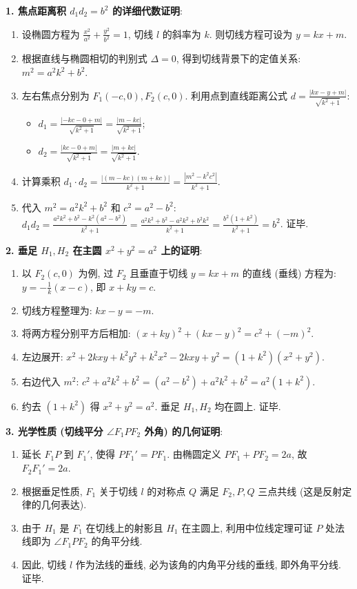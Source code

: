 \begin{proofbox}
\textbf{1. 焦点距离积 $d_1 d_2 = b^2$ 的详细代数证明}:
\begin{enumerate}
    \item 设椭圆方程为 $\frac{x^2}{a^2} + \frac{y^2}{b^2} = 1$, 切线 $l$ 的斜率为 $k$. 则切线方程可设为 $y = kx + m$.
    \item 根据直线与椭圆相切的判别式 $\Delta = 0$, 得到切线背景下的定值关系: $m^2 = a^2k^2 + b^2$.
    \item 左右焦点分别为 $F_1(-c, 0), F_2(c, 0)$. 利用点到直线距离公式 $d = \frac{|kx - y + m|}{\sqrt{k^2+1}}$:
    \begin{itemize}
        \item $d_1 = \frac{|-kc - 0 + m|}{\sqrt{k^2+1}} = \frac{|m - kc|}{\sqrt{k^2+1}}$;
        \item $d_2 = \frac{|kc - 0 + m|}{\sqrt{k^2+1}} = \frac{|m + kc|}{\sqrt{k^2+1}}$.
    \end{itemize}
    \item 计算乘积 $d_1 \cdot d_2 = \frac{|(m - kc)(m + kc)|}{k^2+1} = \frac{|m^2 - k^2c^2|}{k^2+1}$.
    \item 代入 $m^2 = a^2k^2 + b^2$ 和 $c^2 = a^2 - b^2$:
    $d_1 d_2 = \frac{a^2k^2 + b^2 - k^2(a^2 - b^2)}{k^2+1} = \frac{a^2k^2 + b^2 - a^2k^2 + b^2k^2}{k^2+1} = \frac{b^2(1 + k^2)}{k^2+1} = b^2$. 证毕.
\end{enumerate}

\textbf{2. 垂足 $H_1, H_2$ 在主圆 $x^2 + y^2 = a^2$ 上的证明}:
\begin{enumerate}
    \item 以 $F_2(c, 0)$ 为例, 过 $F_2$ 且垂直于切线 $y = kx + m$ 的直线 (垂线) 方程为: $y = -\frac{1}{k}(x - c)$, 即 $x + ky = c$.
    \item 切线方程整理为: $kx - y = -m$.
    \item 将两方程分别平方后相加: $(x + ky)^2 + (kx - y)^2 = c^2 + (-m)^2$.
    \item 左边展开: $x^2 + 2kxy + k^2y^2 + k^2x^2 - 2kxy + y^2 = (1 + k^2)(x^2 + y^2)$.
    \item 右边代入 $m^2$: $c^2 + a^2k^2 + b^2 = (a^2 - b^2) + a^2k^2 + b^2 = a^2(1 + k^2)$.
    \item 约去 $(1 + k^2)$ 得 $x^2 + y^2 = a^2$. 垂足 $H_1, H_2$ 均在圆上. 证毕.
\end{enumerate}

\textbf{3. 光学性质 (切线平分 $\angle F_1PF_2$ 外角) 的几何证明}:
\begin{enumerate}
    \item 延长 $F_1P$ 到 $F_1'$, 使得 $PF_1' = PF_1$. 由椭圆定义 $PF_1 + PF_2 = 2a$, 故 $F_2F_1' = 2a$.
    \item 根据垂足性质, $F_1$ 关于切线 $l$ 的对称点 $Q$ 满足 $F_2, P, Q$ 三点共线 (这是反射定律的几何表达).
    \item 由于 $H_1$ 是 $F_1$ 在切线上的射影且 $H_1$ 在主圆上, 利用中位线定理可证 $P$ 处法线即为 $\angle F_1PF_2$ 的角平分线.
    \item 因此, 切线 $l$ 作为法线的垂线, 必为该角的内角平分线的垂线, 即外角平分线. 证毕.
\end{enumerate}
\end{proofbox}